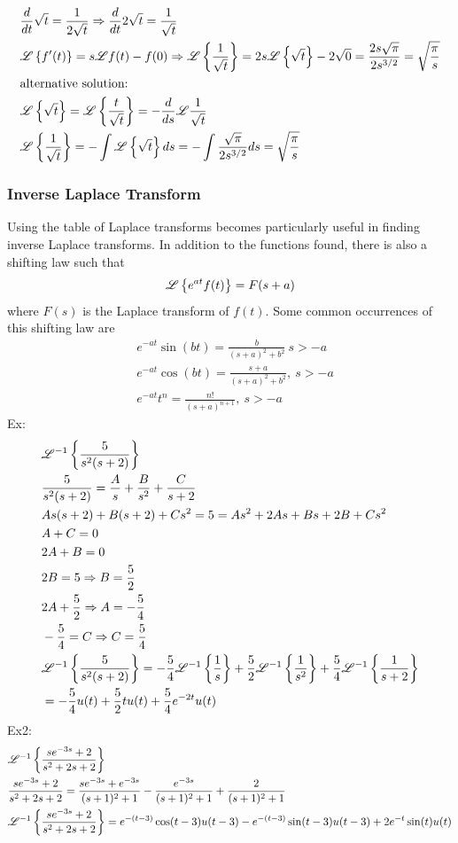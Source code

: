 \documentclass[11pt, fleqn]{article}
\begin{document}
\begin{align*}
    &\frac{d}{dt}\sqrt{t}=\frac{1}{2\sqrt{t}}\Rightarrow \frac{d}{dt}2\sqrt{t}=\frac{1}{\sqrt{t}}\\
    &\mathscr{L}\left\{ f'(t) \right\}=s\mathscr{L}{f(t)}-f(0)\Rightarrow \mathscr{L}\left\{ \frac{1}{\sqrt{t}} \right\}=2s\mathscr{L}\left\{ \sqrt{t} \right\}-2\sqrt{0}=\frac{2s\sqrt{\pi}}{2s^{3/2}}=\sqrt{\frac{\pi}{s}}\\
    &\text{alternative solution:}\\
    &\mathscr{L}\left\{ \sqrt{t} \right\}=\mathscr{L}\left\{ \frac{t}{\sqrt{t}} \right\}=-\frac{d}{ds}\mathscr{L}{\frac{1}{\sqrt{t}}}\\
    &\mathscr{L}\left\{ \frac{1}{\sqrt{t}} \right\}=-\int \mathscr{L}\left\{ \sqrt{t} \right\}ds=-\int\frac{\sqrt{\pi}}{2s^{3/2}}ds=\sqrt{\frac{\pi}{s}}
\end{align*}
\subsubsection{Inverse Laplace Transform}
Using the table of Laplace transforms becomes particularly useful in finding inverse Laplace transforms. In addition to the functions found, there is also a shifting law such that
$$\mathscr{L}\left\{ e^{at}f(t) \right\}=F(s+a)$$
where $F(s)$ is the Laplace transform of $f(t)$.
Some common occurrences of this shifting law are
\begin{align*}
    &e^{-at}\sin(bt)=\frac{b}{(s+a)^2+b^2}\ s>-a\\
    &e^{-at}\cos(bt)=\frac{s+a}{(s+a)^2+b^2},\ s>-a\\
    &e^{-at}t^n=\frac{n!}{(s+a)^{n+1}},\ s>-a
\end{align*}
Ex:
\begin{align*}
    &\mathscr{L}^{-1}\left\{ \frac{5}{s^2(s+2)} \right\}\\
    &\frac{5}{s^2(s+2)}=\frac{A}{s}+\frac{B}{s^2}+\frac{C}{s+2}\\
    &As(s+2)+B(s+2)+Cs^2=5=As^2+2As+Bs+2B+Cs^2\\
    &A+C=0\\
    &2A+B=0\\
    &2B=5\Rightarrow B=\frac{5}{2}\\
    &2A+\frac{5}{2}\Rightarrow A=-\frac{5}{4}\\
    &-\frac{5}{4}=C\Rightarrow C=\frac{5}{4}\\
    &\mathscr{L}^{-1}\left\{ \frac{5}{s^2(s+2)} \right\}=-\frac{5}{4}\mathscr{L}^{-1}\left\{ \frac{1}{s} \right\}+\frac{5}{2}\mathscr{L}^{-1}\left\{ \frac{1}{s^2} \right\}+\frac{5}{4}\mathscr{L}^{-1}\left\{ \frac{1}{s+2} \right\}\\
    &=-\frac{5}{4}u(t)+\frac{5}{2}tu(t)+\frac{5}{4}e^{-2t}u(t)
\end{align*}
Ex2:
\begin{align*}
    &\mathscr{L}^{-1}\left\{ \frac{se^{-3s}+2}{s^2+2s+2} \right\}\\
    &\frac{se^{-3s}+2}{s^2+2s+2}=\frac{se^{-3s}+e^{-3s}}{(s+1)^2+1}-\frac{e^{-3s}}{(s+1)^2+1}+\frac{2}{(s+1)^2+1}\\
    &\mathscr{L}^{-1}\left\{ \frac{se^{-3s}+2}{s^2+2s+2} \right\}=e^{-(t-3)}\cos(t-3)u(t-3)-e^{-(t-3)}\sin(t-3)u(t-3)+2e^{-t}\sin(t)u(t)
\end{align*}
\end{document}
